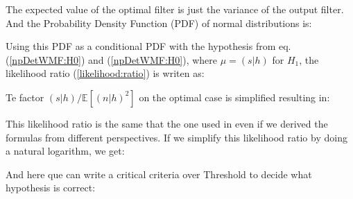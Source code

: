 
\newp The expected value of the optimal filter is just the variance of the output filter. And the Probability Density Function (PDF) of normal distributions is:


\newp Using this PDF as a conditional PDF with the hypothesis from eq. (\ref{npDetWMF:H0}) and (\ref{npDetWMF:H0}), where $\mu = (s|h)$ for $H_1$, the likelihood ratio (\ref{likelihood:ratio}) is writen as: 


\newp Te factor $(s|h) / \mathbb{E}[(n|h)^{2}]$ on the optimal case is simplified resulting in:


\newp This likelihood ratio is the same that the one used in \cite{ligo-gauss-case, ligo-1992} even if we derived the formulas from different perspectives. If we simplify this likelihood ratio by doing a natural logarithm, we get:



\newp And here que can write a critical criteria over Threshold to decide what hypothesis is correct: 



